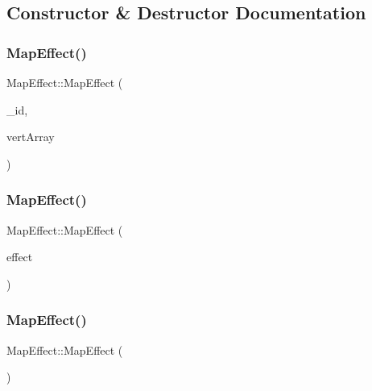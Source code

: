 \subsection{Constructor \& Destructor Documentation}
\mbox{\label{class_map_effect_ac517bf5e557ac443b45a1dedb2b216ab}} 
\subsubsection{\texorpdfstring{Map\+Effect()}{MapEffect()}\hspace{0.1cm}{\footnotesize\ttfamily [1/3]}}
{\footnotesize\ttfamily Map\+Effect\+::\+Map\+Effect (\begin{DoxyParamCaption}\item[{int}]{\+\_\+id,  }\item[{sf\+::\+Vertex\+Array}]{vert\+Array }\end{DoxyParamCaption})}

\mbox{\label{class_map_effect_aff543fedf91ca1798942f756c8388aa3}} 
\subsubsection{\texorpdfstring{Map\+Effect()}{MapEffect()}\hspace{0.1cm}{\footnotesize\ttfamily [2/3]}}
{\footnotesize\ttfamily Map\+Effect\+::\+Map\+Effect (\begin{DoxyParamCaption}\item[{const \mbox{\hyperlink{class_map_effect}{Map\+Effect}} \&}]{effect }\end{DoxyParamCaption})}

\mbox{\label{class_map_effect_aa271c0e92d24c599620890409a7a0de6}} 
\subsubsection{\texorpdfstring{Map\+Effect()}{MapEffect()}\hspace{0.1cm}{\footnotesize\ttfamily [3/3]}}
{\footnotesize\ttfamily Map\+Effect\+::\+Map\+Effect (\begin{DoxyParamCaption}{ }\end{DoxyParamCaption})}



